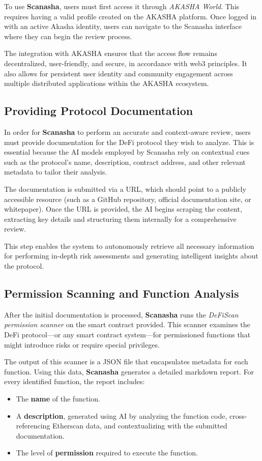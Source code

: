 \documentclass[paper=a4, fontsize=11pt,twoside]{scrartcl}
\begin{document}
To use \textbf{Scanasha}, users must first access it through \textit{AKASHA World}. This requires having a valid profile created on the AKASHA platform. Once logged in with an active Akasha identity, users can navigate to the Scanasha interface where they can begin the review process.

The integration with AKASHA ensures that the access flow remains decentralized, user-friendly, and secure, in accordance with web3 principles. It also allows for persistent user identity and community engagement across multiple distributed applications within the AKASHA ecosystem.

\subsection{Providing Protocol Documentation}

In order for \textbf{Scanasha} to perform an accurate and context-aware review, users must provide documentation for the DeFi protocol they wish to analyze. This is essential because the AI models employed by Scanasha rely on contextual cues such as the protocol's name, description, contract address, and other relevant metadata to tailor their analysis.

The documentation is submitted via a URL, which should point to a publicly accessible resource (such as a GitHub repository, official documentation site, or whitepaper). Once the URL is provided, the AI begins scraping the content, extracting key details and structuring them internally for a comprehensive review.

This step enables the system to autonomously retrieve all necessary information for performing in-depth risk assessments and generating intelligent insights about the protocol.

\subsection{Permission Scanning and Function Analysis}

After the initial documentation is processed, \textbf{Scanasha} runs the \textit{DeFiScan permission scanner} on the smart contract provided. This scanner examines the DeFi protocol—or any smart contract system—for permissioned functions that might introduce risks or require special privileges.

The output of this scanner is a JSON file that encapsulates metadata for each function. Using this data, \textbf{Scanasha} generates a detailed markdown report. For every identified function, the report includes:
\begin{itemize}
  \item The \textbf{name} of the function.
  \item A \textbf{description}, generated using AI by analyzing the function code, cross-referencing Etherscan data, and contextualizing with the submitted documentation.
  \item The level of \textbf{permission} required to execute the function.
\end{itemize}
\end{document}

